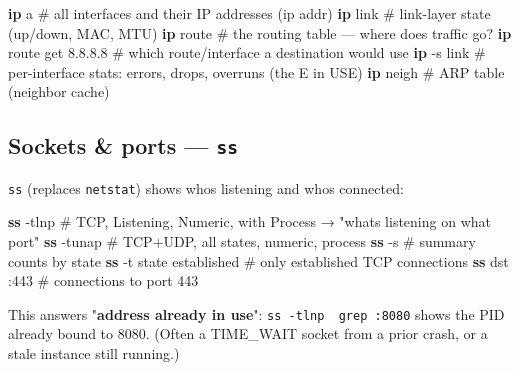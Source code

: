 \documentclass[11pt]{article}
\newenvironment{Shaded}{\begin{snugshade}}{\end{snugshade}}
\newcommand{\AttributeTok}[1]{\textcolor[rgb]{0.16,0.50,0.73}{#1}}
\newcommand{\CommentTok}[1]{\textcolor[rgb]{0.48,0.49,0.49}{#1}}
\newcommand{\ExtensionTok}[1]{\textcolor[rgb]{0.00,0.60,1.00}{\textbf{#1}}}
\newcommand{\NormalTok}[1]{\textcolor[rgb]{0.81,0.81,0.76}{#1}}
\begin{document}
\begin{Shaded}
\begin{Highlighting}[]
\ExtensionTok{ip}\NormalTok{ a                    }\CommentTok{\# all interfaces and their IP addresses (ip addr)}
\ExtensionTok{ip}\NormalTok{ link                 }\CommentTok{\# link{-}layer state (up/down, MAC, MTU)}
\ExtensionTok{ip}\NormalTok{ route                }\CommentTok{\# the routing table — where does traffic go?}
\ExtensionTok{ip}\NormalTok{ route get 8.8.8.8    }\CommentTok{\# which route/interface a destination would use}
\ExtensionTok{ip} \AttributeTok{{-}s}\NormalTok{ link              }\CommentTok{\# per{-}interface stats: errors, drops, overruns (the \textquotesingle{}E\textquotesingle{} in USE)}
\ExtensionTok{ip}\NormalTok{ neigh                }\CommentTok{\# ARP table (neighbor cache)}
\end{Highlighting}
\end{Shaded}

\subsection{\texorpdfstring{Sockets \& ports --- \texttt{ss}}{Sockets \& ports --- ss}}\label{sockets--ports--ss}

\texttt{ss} (replaces \texttt{netstat}) shows who\textquotesingle s listening and who\textquotesingle s connected:


\begin{Shaded}
\begin{Highlighting}[]
\ExtensionTok{ss} \AttributeTok{{-}tlnp}                \CommentTok{\# TCP, Listening, Numeric, with Process → "what\textquotesingle{}s listening on what port"}
\ExtensionTok{ss} \AttributeTok{{-}tunap}               \CommentTok{\# TCP+UDP, all states, numeric, process}
\ExtensionTok{ss} \AttributeTok{{-}s}                   \CommentTok{\# summary counts by state}
\ExtensionTok{ss} \AttributeTok{{-}t}\NormalTok{ state established }\CommentTok{\# only established TCP connections}
\ExtensionTok{ss}\NormalTok{ dst :443             }\CommentTok{\# connections to port 443}
\end{Highlighting}
\end{Shaded}

This answers "\textbf{address already in use}": \texttt{ss\ -tlnp\ \textbar{}\ grep\ :8080} shows the PID already bound to 8080. (Often a TIME\_WAIT socket from a prior crash, or a stale instance still running.)
\end{document}
